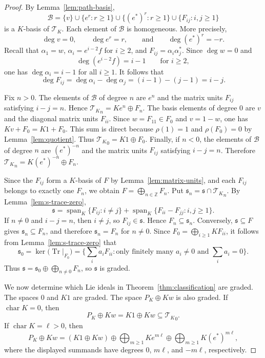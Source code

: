 \documentclass[10pt,a4paper]{amsart}
\newcommand{\T}{\mathscr T_K}
\begin{document}
\begin{proof}
By Lemma~\ref{lem:path-basis},
$$
\mathcal B=\{v\}\cup\{e^r:r\geq1\}\cup\{(e^*)^r:r\geq1\}\cup\{F_{ij}:i,j\geq1\}
$$
is a $K$-basis of $\T$. Each element of $\mathcal B$ is homogeneous. More precisely,
$$
\deg v=0,\qquad \deg e^r=r,\qquad\text{and}\qquad \deg (e^*)^r=-r.
$$
Recall that $\alpha_1=w$, $\alpha_i=e^{i-2}f$ for $i\geq2$, and $F_{ij}=\alpha_i\alpha_j^*$. Since $\deg w=0$ and
$$
\deg(e^{i-2}f)=i-1\qquad\text{for }i\geq2,
$$
one has $\deg\alpha_i=i-1$ for all $i\geq1$. It follows that
$$
\deg F_{ij}=\deg\alpha_i-\deg\alpha_j=(i-1)-(j-1)=i-j.
$$

Fix $n>0$. The elements of $\mathcal B$ of degree $n$ are $e^n$ and the matrix units $F_{ij}$ satisfying $i-j=n$. Hence ${\T}_n=Ke^n\oplus F_n$. The basis elements of degree $0$ are $v$ and the diagonal matrix units $F_{ii}$. Since $w=F_{11}\in F_0$ and $v=1-w$, one has $Kv+F_0=K1+F_0$. This sum is direct because $\rho(1)=1$ and $\rho(F_0)=0$ by Lemma~\ref{lem:quotient}. Thus ${\T}_0=K1\oplus F_0$. Finally, if $n<0$, the elements of $\mathcal B$ of degree $n$ are $(e^*)^{-n}$ and the matrix units $F_{ij}$ satisfying $i-j=n$. Therefore ${\T}_n=K(e^*)^{-n}\oplus F_n$.

Since the $F_{ij}$ form a $K$-basis of $F$ by Lemma~\ref{lem:matrix-units}, and each $F_{ij}$ belongs to exactly one $F_n$, we obtain $F=\bigoplus_{n\in\mathbb Z}F_n$. Put $\mathfrak s_n=\mathfrak s\cap{\T}_n$. By Lemma~\ref{lem:s-trace-zero},
$$
\mathfrak s=\operatorname{span}_K\{F_{ij}:i\neq j\}
+\operatorname{span}_K\{F_{ii}-F_{jj}:i,j\geq1\}.
$$
If $n\neq0$ and $i-j=n$, then $i\neq j$, so $F_{ij}\in\mathfrak s$. Hence $F_n\subseteq\mathfrak s_n$. Conversely, $\mathfrak s\subseteq F$ gives $\mathfrak s_n\subseteq F_n$, and therefore $\mathfrak s_n=F_n$ for $n\neq0$.
Since $F_0=\bigoplus_{i\geq1}KF_{ii}$, it follows from  Lemma~\ref{lem:s-trace-zero} that
$$
\mathfrak s_0
=\ker\bigl(\operatorname{Tr}|_{F_0}\bigr)
=\Big\{\sum_i a_iF_{ii}:\text{only finitely many }a_i\neq0
\text{ and }\sum_i a_i=0\Big\}.
$$
Thus $\mathfrak s=\mathfrak s_0\oplus\bigoplus_{n\neq0}F_n$, so $\mathfrak s$ is graded.

We now determine which Lie ideals in Theorem~\ref{thm:classification} are graded. The spaces $0$ and $K1$ are graded. The space $P_K\oplus Kw$ is also graded. If $\operatorname{char}K=0$, then
$$
P_K\oplus Kw=K1\oplus Kw\subseteq{\T}_0.
$$
If $\operatorname{char}K=\ell>0$, then
$$
P_K\oplus Kw
=(K1\oplus Kw)
\oplus\bigoplus_{m\geq1}Ke^{m\ell}
\oplus\bigoplus_{m\geq1}K(e^*)^{m\ell},
$$
where the displayed summands have degrees $0$, $m\ell$, and $-m\ell$, respectively.


\end{proof}
\end{document}
